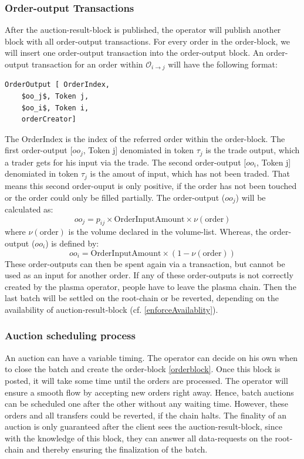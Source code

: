 \documentclass[11pt,parskip=full]{scrartcl}%
\def\pO{\mathcal{O}}
\def\ra{\rightarrow}
\begin{document}
\subsubsection{Order-output Transactions}
After the auction-result-block is published, the operator will publish another block with all order-output transactions. For every order in the order-block, we will insert one order-output transaction into the order-output block. 
An order-output transaction for an order within $\pO_{i\ra j}$ will have the following format:
\begin{lstlisting}
OrderOutput [ OrderIndex,
    $oo_j$, Token j,
    $oo_i$, Token i,
    orderCreator]
\end{lstlisting}
The OrderIndex is the index of the referred order within the order-block.
The first order-output [$oo_j$, Token j] denomiated in token $\tau_j$ is the trade output, which a trader gets for his input via the trade. 
The second order-output [$oo_i$, Token j] denomiated in token $\tau_j$ is the amout of input, which has not been traded. That means this second order-ouput is only positive, if the order has not been touched or the order could only be filled partially.
The order-output ($oo_j$) will be calculated as:
\begin{equation}
  oo_j = p_{ij} \times \text{OrderInputAmount} \times \nu(\text{order}) 
    \label{fee_equ}
\end{equation}
where $\nu(\text{order})$ is the volume declared in the volume-list.  
Whereas, the order-output ($oo_i$) is defined by:
\begin{equation}
  oo_i =  \text{OrderInputAmount}\times (1 - \nu(\text{order}))
\end{equation}
These order-outputs can then be spent again via a transaction, but cannot be used as an input for another order. 
If any of these order-outputs is not correctly created by the plasma operator, people have to leave the plasma chain. 
Then the last batch will be settled on the root-chain or be reverted, depending on the availability of auction-result-block (cf. \ref{enforceAvailablity}). 



\subsubsection{Auction scheduling process}

An auction can have a variable timing. 
The operator can decide on his own when to close the batch and create the order-block \ref{orderblock}. 
Once this block is posted, it will take some time until the orders are processed. 
The operator will ensure a smooth flow by accepting new orders right away. 
Hence, batch auctions can be scheduled one after the other without any waiting time. 
However, these orders and all transfers could be reverted, if the chain halts. 
The finality of an auction is only guaranteed after the client sees the auction-result-block, since with the knowledge of this block, they can answer all data-requests on the root-chain and thereby ensuring the finalization of the batch.
\end{document}

